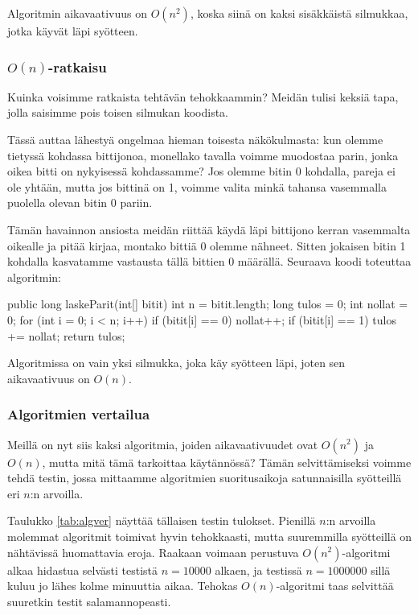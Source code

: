 Algoritmin aikavaativuus on $O(n^2)$, koska siinä on kaksi
sisäkkäistä silmukkaa, jotka käyvät läpi syötteen.

\subsubsection{$O(n)$-ratkaisu}

Kuinka voisimme ratkaista tehtävän tehokkaammin?
Meidän tulisi keksiä tapa, jolla saisimme
pois toisen silmukan koodista.

Tässä auttaa lähestyä ongelmaa hieman toisesta
näkökulmasta: kun olemme tietyssä kohdassa bittijonoa,
monellako tavalla voimme muodostaa parin,
jonka oikea bitti on nykyisessä kohdassamme?
Jos olemme bitin 0 kohdalla, pareja ei ole yhtään,
mutta jos bittinä on 1, voimme valita minkä tahansa
vasemmalla puolella olevan bitin 0 pariin.

Tämän havainnon ansiosta meidän riittää käydä läpi
bittijono kerran vasemmalta oikealle ja pitää kirjaa,
montako bittiä 0 olemme nähneet.
Sitten jokaisen bitin 1 kohdalla kasvatamme
vastausta tällä bittien 0 määrällä.
Seuraava koodi toteuttaa algoritmin:

\begin{code}
public long laskeParit(int[] bitit) {
    int n = bitit.length;
    long tulos = 0;
    int nollat = 0;
    for (int i = 0; i < n; i++) {
        if (bitit[i] == 0) nollat++;
        if (bitit[i] == 1) tulos += nollat;
    }
    return tulos;
}
\end{code}

Algoritmissa on vain yksi silmukka, joka käy syötteen läpi,
joten sen aikavaativuus on $O(n)$.

\subsubsection{Algoritmien vertailua}

Meillä on nyt siis kaksi algoritmia, joiden aikavaativuudet ovat
$O(n^2)$ ja $O(n)$, mutta mitä tämä tarkoittaa käytännössä?
Tämän selvittämiseksi voimme tehdä testin,
jossa mittaamme algoritmien suoritusaikoja
satunnaisilla syötteillä eri $n$:n arvoilla.

Taulukko \ref{tab:algver} näyttää tällaisen testin tulokset.
Pienillä $n$:n arvoilla molemmat algoritmit toimivat
hyvin tehokkaasti, mutta suuremmilla syötteillä on
nähtävissä huomattavia eroja.
Raakaan voimaan perustuva $O(n^2)$-algoritmi
alkaa hidastua selvästi testistä $n=10000$ alkaen,
ja testissä $n=1000000$ sillä kuluu jo lähes kolme minuuttia aikaa.
Tehokas $O(n)$-algoritmi taas selvittää suuretkin testit
salamannopeasti.

